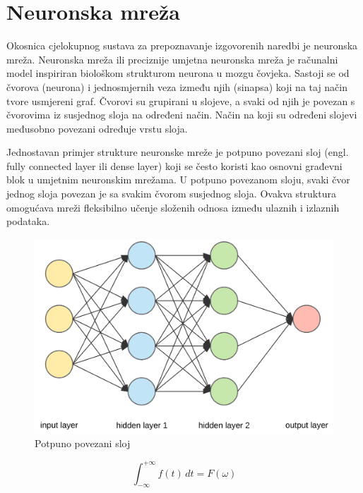 \chapter{Neuronska mreža}
\label{pog:neuronska_mreza}

Okosnica cjelokupnog sustava za prepoznavanje izgovorenih naredbi je neuronska mreža.
Neuronska mreža ili preciznije umjetna neuronska mreža je računalni model inspiriran
biološkom strukturom neurona u mozgu čovjeka. Sastoji se od čvorova (neurona) i jednosmjernih
veza između njih (sinapsa) koji na taj način tvore usmjereni graf. Čvorovi su grupirani u slojeve,
a svaki od njih je povezan s čvorovima iz susjednog sloja na određeni način. Način na koji su
određeni slojevi međusobno povezani određuje vrstu sloja. 

Jednostavan primjer strukture neuronske mreže je potpuno povezani sloj (engl. fully connected layer
ili dense layer) koji se često koristi kao osnovni građevni blok u umjetnim neuronskim mrežama.
U potpuno povezanom sloju, svaki čvor jednog sloja povezan je sa svakim čvorom susjednog sloja.
Ovakva struktura omogućava mreži fleksibilno učenje složenih odnosa između ulaznih i izlaznih podataka.

\begin{figure}[htb]
    \centering
    \includegraphics[width=0.38\linewidth]{dense_layer.png} 
    \caption{Potpuno povezani sloj}
    \label{slk:dense_layer}
\end{figure}

  \begin{equation}
    \label{jed:prvajednadzba}
    \int_{-\infty}^{+\infty}f(t)\,dt=F(\omega)
  \end{equation}


